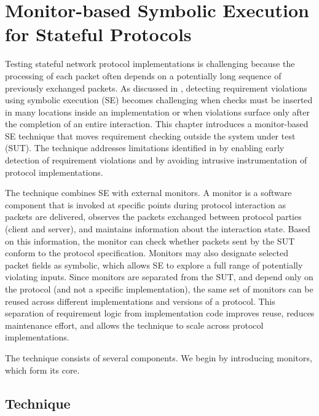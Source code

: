 \chapter{Monitor-based Symbolic Execution for Stateful Protocols}\label{chapter:paper2}
Testing stateful network protocol implementations is challenging because the processing of each packet often depends on a potentially long sequence of previously exchanged packets.
As discussed in , detecting requirement violations using symbolic execution (SE) becomes challenging when checks must be inserted in many locations inside an implementation or when violations surface only after the completion of an entire interaction.
This chapter introduces a monitor-based SE technique that moves requirement checking outside the system under test (SUT).
The technique addresses limitations identified in  by enabling early detection of requirement violations and by avoiding intrusive instrumentation of protocol implementations.

The technique combines SE with external monitors.
A monitor is a software component that is invoked at specific points during protocol interaction as packets are delivered, observes the packets exchanged between protocol parties (\eg client and server), and maintains information about the interaction state.
Based on this information, the monitor can check whether packets sent by the SUT conform to the protocol specification.
Monitors may also designate selected packet fields as symbolic, which allows SE to explore a full range of potentially violating inputs.
Since monitors are separated from the SUT, and depend only on the protocol (and not a specific implementation), the same set of monitors can be reused across different implementations and versions of a protocol.
This separation of requirement logic from implementation code improves reuse, reduces maintenance effort, and allows the technique to scale across protocol implementations.

The technique consists of several components. 
We begin by introducing monitors, which form its core.
\section{Technique}

